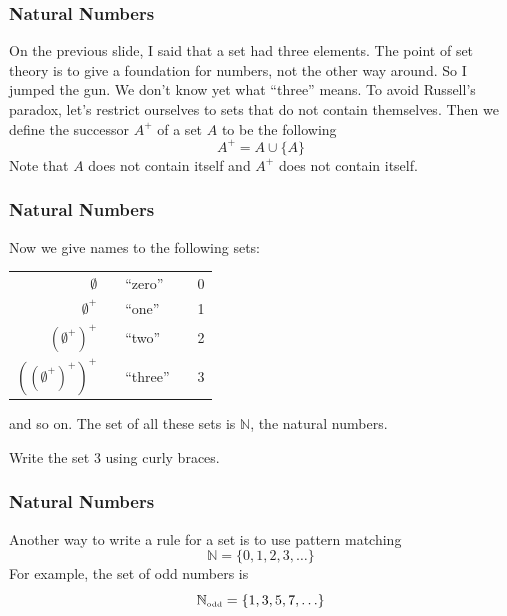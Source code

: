 \documentclass[xcolor=dvipsnames]{beamer}
\begin{document}
\begin{frame}
  \frametitle{Natural Numbers}
On the previous slide, I said that a set had three elements. The point
of set theory is to give a foundation for numbers, not the other way
around. So I jumped the gun. We don't know yet what ``three'' means.
To avoid Russell's paradox, let's restrict ourselves to sets that do
not contain themselves. Then we define the successor $A^{+}$ of a set $A$ to
be the following
\begin{equation}
  \label{eq:mooxeefi}
  A^{+}=A\cup\{A\}
\end{equation}
Note that $A$ does not contain itself and $A^{+}$ does not contain
itself. 
\end{frame}

\begin{frame}
  \frametitle{Natural Numbers}
  Now we give names to the following sets:

  \bigskip

\begin{tabular}{rclcl}
    $\emptyset$ & \hspace{.5in} & ``zero'' & \hspace{.5in} & 0 \\ 
    $\emptyset^{+}$ & \hspace{.5in} & ``one'' & \hspace{.5in} & 1 \\ 
    $\displaystyle \left(\emptyset^{+}\right)^{+}$ & \hspace{.5in} & ``two'' & \hspace{.5in} & 2 \\ 
    $\displaystyle \left(\left(\emptyset^{+}\right)^{+}\right)^{+}$ & \hspace{.5in} & ``three'' & \hspace{.5in} & 3 \\ 
  \end{tabular}

\bigskip

  and so on. The set of all these sets is $\mathbb{N}$, the natural
  numbers.

  {\ubung} Write the set 3 using curly braces.
\end{frame}

\begin{frame}
  \frametitle{Natural Numbers}
Another way to write a rule for a set is to use pattern
  matching
  \begin{equation}
    \label{eq:aiheegor}
    \mathbb{N}=\{0,1,2,3,\ldots\}
  \end{equation}
  For example, the set of odd numbers is
  \begin{equation}
    \label{eq:laibaesh}
 \mathbb{N}_{\mbox{\tiny odd}}=\{1,3,5,7,\ldots\}
  \end{equation}
\end{frame}
\end{document}

